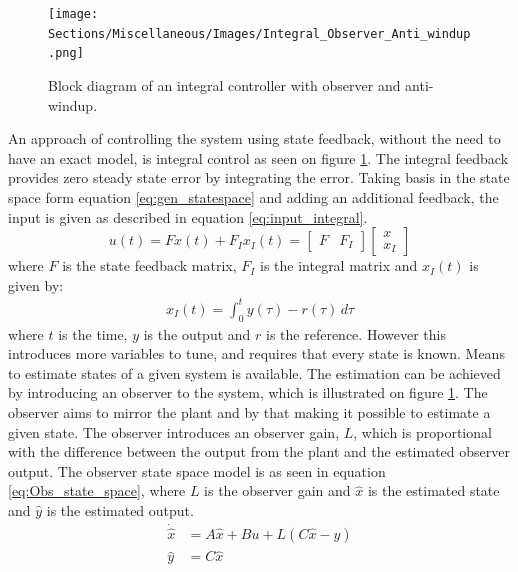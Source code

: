 \documentclass[../../main.tex]{subfiles}
\begin{document}
\begin{figure}
    \centering
    \texttt{[image: Sections/Miscellaneous/Images/Integral\_Observer\_Anti\_windup.png]}
    \caption{Block diagram of an integral controller with observer and anti-windup.}
    \label{fig:Integral_Observer_Diagram}
\end{figure}

An approach of controlling the system using state feedback, without the need to have an exact model, is integral control as seen on figure \ref{fig:Integral_Observer_Diagram}. The integral feedback provides zero steady state error by integrating the error. Taking basis in the state space form equation \ref{eq:gen_statespace} and adding an additional feedback, the input is given as described in equation \ref{eq:input_integral}.
\begin{equation}\label{eq:input_integral}
    u(t)=Fx(t)+F_Ix_I(t)=
    \begin{bmatrix}
        F & F_I
    \end{bmatrix}
    \begin{bmatrix}
        x\\
        x_I
    \end{bmatrix}
\end{equation}
where $F$ is the state feedback matrix, $F_I$ is the integral matrix and $x_I(t)$ is given by:
\begin{equation}
    \begin{split}
        x_I(t)=\int_0^t y(\tau)-r(\tau)\,d\tau
    \end{split}
\end{equation}
where $t$ is the time, $y$ is the output and $r$ is the reference. However this introduces more variables to tune, and requires that every state is known. Means to estimate states of a given system is available. The estimation can be achieved by introducing an observer to the system, which is illustrated on figure \ref{fig:Integral_Observer_Diagram}. The observer aims to mirror the plant and by that making it possible to estimate a given state. The observer introduces an observer gain, $L$, which is proportional with the difference between the output from the plant and the estimated observer output. The observer state space model is as seen in equation \ref{eq:Obs_state_space}, where $L$ is the observer gain and $\hat{x}$ is the estimated state and $\hat{y}$ is the estimated output.
\begin{equation}\label{eq:Obs_state_space}
    \begin{split}
        \Dot{\hat{x}}&=A\hat{x}+Bu+L(C\hat{x}-y)\\
        \hat{y}&=C\hat{x}
    \end{split}
\end{equation}
\end{document}
